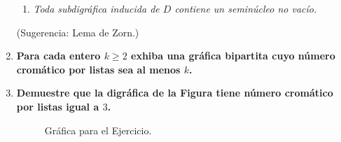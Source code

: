 \documentclass{article}
\begin{document}
\begin{enumerate}
\begin{enumerate}
      \item \textit{Toda subdigr\'afica inducida de $D$ contiene un semin\'ucleo no
        vac\'io.}
    \end{enumerate}
    (Sugerencia: Lema de Zorn.)

  \item \textbf{Para cada entero $k \ge 2$ exhiba una gr\'afica bipartita cuyo
    n\'umero crom\'atico por listas sea al menos $k$.}

  \item \textbf{Demuestre que la digr\'afica de la Figura tiene
    n\'umero crom\'atico por listas igual a $3$.}
    \begin{figure}[ht!]
    \centering
    \caption{Gr\'afica para el Ejercicio.}
    \end{figure}
\end{enumerate}
\end{document}
